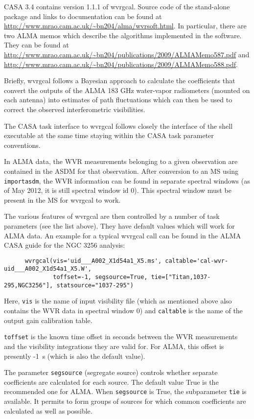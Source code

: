 CASA 3.4 contains version 1.1.1 of wvrgcal. Source code of the stand-alone package and links 
to documentation can be
found at \url{http://www.mrao.cam.ac.uk/\~bn204/alma/wvrsoft.html}. In particular, there are
two ALMA memos which describe the algorithms implemented in the software. They can be found
at \url{http://www.mrao.cam.ac.uk/\~bn204/publications/2009/ALMAMemo587.pdf} and
\url{http://www.mrao.cam.ac.uk/\~bn204/publications/2009/ALMAMemo588.pdf}.

Briefly, wvrgcal follows a Bayesian approach to calculate the coefficients that convert the outputs of
the ALMA 183 GHz water-vapor radiometers (mounted on each antenna) into estimates of path fluctuations 
which can then be used to correct the observed interferometric visibilities.

The CASA task interface to wvrgcal follows closely the interface of the shell executable
at the same time staying within the CASA task parameter conventions. 

In ALMA data, the WVR measurements belonging to a given observation are contained in the ASDM
for that observation. After conversion to an MS using {\tt importasdm}, the WVR information
can be found in separate spectral windows (as of May 2012, it is still spectral window id 0).
This spectral window must be present in the MS for wvrgcal to work.

The various features of wvrgcal are then controlled by a number of task parameters (see the list above). 
They have default values which will work for ALMA data.
An example for a typical wvrgcal call can be found in the ALMA CASA guide for the NGC 3256 analysis:

\small
\begin{verbatim}
      wvrgcal(vis='uid___A002_X1d54a1_X5.ms', caltable='cal-wvr-uid___A002_X1d54a1_X5.W',  
              toffset=-1, segsource=True, tie=["Titan,1037-295,NGC3256"], statsource="1037-295")
\end{verbatim}
\normalsize

Here, {\tt vis} is the name of input visibility file (which as mentioned above also contains the
WVR data in spectral window 0) and {\tt caltable} is the name of the output gain calibration table.

{\tt toffset} is the known time offset in seconds between the WVR measurements and the visibility integrations
they are valid for. For ALMA, this offset is presently -1~s (which is also the default value).

The parameter {\tt segsource} (segregate source) controls whether separate coefficients are calculated
for each source. The default value True is the recommended one for ALMA.
When {\tt segsource} is True, the subparameter {\tt tie} is available. It permits to form groups of
sources for which common coefficients are calculated as well as possible.

